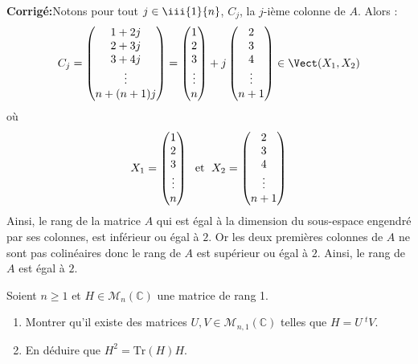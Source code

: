 \documentclass[a4paper,twoside,french,11pt]{VcCours}
\newcommand{\corr}{\textbf{Corrigé:}}
\begin{document}
\corr Notons pour tout $j \in \iii{1}{n}$, $C_j$, la $j$-ième colonne de $A$. Alors :
$$ C_j = \begin{pmatrix}
1 + 2j \\
2 + 3j \\
3 + 4j \\
\vdots \\
n + (n+1)j
\end{pmatrix} = \begin{pmatrix}
1  \\
2  \\
3  \\
\vdots \\
 n
\end{pmatrix} + j \begin{pmatrix}
2 \\
3 \\
4\\
\vdots \\
n+1
\end{pmatrix} \in \Vect(X_1,X_2)$$
où 
$$ X_1= \begin{pmatrix}
1  \\
2  \\
3  \\
\vdots \\
 n
\end{pmatrix} \; \hbox{ et } \; X_2 = \begin{pmatrix}
2 \\
3 \\
4\\
\vdots \\
n+1
\end{pmatrix}$$
Ainsi, le rang de la matrice $A$ qui est égal à la dimension du sous-espace engendré par ses colonnes, est inférieur ou égal à $2$. Or les deux premières colonnes de $A$ ne sont pas colinéaires donc le rang de $A$ est supérieur ou égal à $2$. Ainsi, le rang de $A$ est égal à $2$.




\begin{Exercice}{} Soient $n \geq 1$ et $H \in \mathcal{M}_n(\mathbb{C})$ une matrice de rang 1.
    \begin{enumerate}
      \item
        Montrer qu'il existe des matrices $U,V \in \mathcal{M}_{n,1}(\mathbb{C})$ telles que $H = U ~^tV$.
      \item En déduire que $H^2 = \textrm{Tr}(H)H$.
 \end{enumerate}
\end{Exercice}
\end{document}
